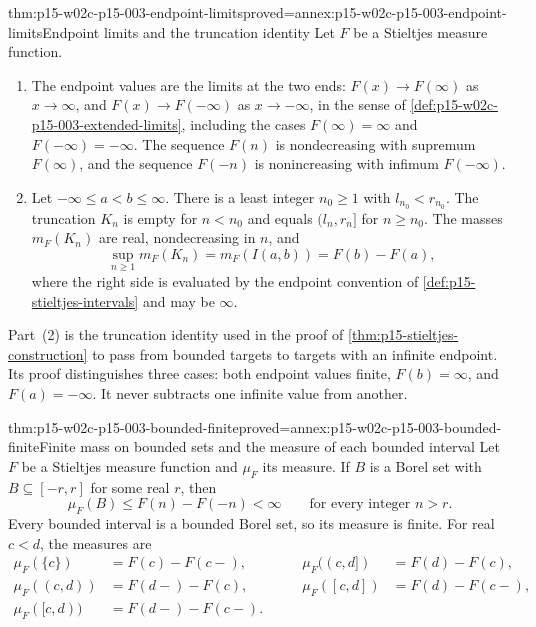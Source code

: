 \begin{hblemma}{thm:p15-w02c-p15-003-endpoint-limits}{proved=annex:p15-w02c-p15-003-endpoint-limits}{Endpoint limits and the truncation identity}
Let \(F\) be a Stieltjes measure function.
\begin{enumerate}
\item The endpoint values are the limits at the two ends:
      \(F(x)\to F(\infty)\) as \(x\to\infty\), and
      \(F(x)\to F(-\infty)\) as \(x\to-\infty\), in the sense of
      \cref{def:p15-w02c-p15-003-extended-limits}, including the cases
      \(F(\infty)=\infty\) and \(F(-\infty)=-\infty\). The sequence
      \(F(n)\) is nondecreasing with supremum \(F(\infty)\), and the
      sequence \(F(-n)\) is nonincreasing with infimum \(F(-\infty)\).
\item Let \(-\infty\leq a<b\leq\infty\). There is a least integer
      \(n_0\geq1\) with \(l_{n_0}<r_{n_0}\). The truncation \(K_n\) is
      empty for \(n<n_0\) and equals \((l_n,r_n]\) for
      \(n\geq n_0\). The masses \(m_F(K_n)\) are real, nondecreasing in
      \(n\), and
      \[
       \sup_{n\geq1}m_F(K_n)=m_F(I(a,b))=F(b)-F(a),
      \]
      where the right side is evaluated by the endpoint convention of
      \cref{def:p15-stieltjes-intervals} and may be \(\infty\).
\end{enumerate}
\end{hblemma}

Part~(2) is the truncation identity used in the proof of
\cref{thm:p15-stieltjes-construction} to pass from bounded targets to
targets with an infinite endpoint. Its proof distinguishes three cases:
both endpoint values finite, \(F(b)=\infty\), and \(F(a)=-\infty\). It
never subtracts one infinite value from another.

\begin{hbcorollary}{thm:p15-w02c-p15-003-bounded-finite}{proved=annex:p15-w02c-p15-003-bounded-finite}{Finite mass on bounded sets and the measure of each bounded interval}
Let \(F\) be a Stieltjes measure function and \(\mu_F\) its measure.
If \(B\) is a Borel set with \(B\subseteq[-r,r]\) for some real
\(r\), then
\[
 \mu_F(B)\leq F(n)-F(-n)<\infty
 \qquad\text{for every integer }n>r .
\]
Every bounded interval is a bounded Borel set, so its measure is finite.
For real \(c<d\), the measures are
\[
 \begin{aligned}
 \mu_F(\{c\})&=F(c)-F(c-), &\qquad
 \mu_F((c,d])&=F(d)-F(c),\\
 \mu_F((c,d))&=F(d-)-F(c), &\qquad
 \mu_F([c,d])&=F(d)-F(c-),\\
 \mu_F([c,d))&=F(d-)-F(c-). &&
 \end{aligned}
\]
\end{hbcorollary}

